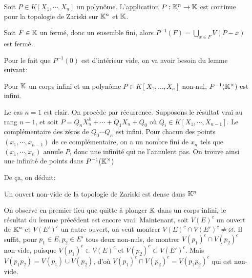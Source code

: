 \documentclass{article}
\begin{document}
\begin{proposition}
Soit $P \in K[X_1, \cdots, X_n]$ un polynôme. L'application $P: \mathbb{K}^n \to \mathbb{K}$ est continue pour la topologie de Zariski sur $\mathbb{K}^n$ et $\mathbb{K}$.
\end{proposition}

\begin{preuve}
Soit $F \in \mathbb{K}$ un fermé, donc un ensemble fini, alors $P^{-1}(F) = \bigcup_{x \in F}{V(P-x)}$ est fermé.
\end{preuve}

Pour le fait que $P^{-1}(0)$ est d'intérieur vide, on va avoir besoin du lemme suivant:
\begin{lemme}
Pour $\mathbb{K}$ un corps infini et un polynôme $P \in K[X_1, \ldots, X_n]$ non-nul, $P^{-1}(\mathbb{K}^\times)$ est infini.\\
\end{lemme}

\begin{preuve}
Le cas $n = 1$ est clair. On procède par récurrence. Supposons le résultat vrai au rang $n-1$, et soit $P = Q_nX_n^k + \cdots + Q_1X_n + Q_0$ où $Q_i \in K[X_1, \cdots, X_{n-1}]$. Le complémentaire des zéros de $Q_0\cdots Q_n$ est infini. Pour chacun des points $(x_1, \cdots, x_{n-1})$ de ce complémentaire, on a un nombre fini de $x_n$ tels que $(x_1, \cdots, x_n)$ annule $P$, donc une infinité qui ne l'annulent pas. On trouve ainsi une infinité de points dans $P^{-1}(\mathbb{K}^\times)$\\
\end{preuve}

De ça, on déduit:

\begin{proposition}
Un ouvert non-vide de la topologie de Zariski est dense dans $\mathbb{K}^n$
\end{proposition}

\begin{preuve}
On observe en premier lieu que quitte à plonger $\mathbb{K}$ dans un corps infini, le résultat du lemme précédent est encore vrai. Maintenant, soit $V(E)^c$ un ouvert de $\mathbb{K}^n$ et $V(E')^c$ un autre ouvert, on veut montrer $V(E)^c \cap V(E')^c \neq \varnothing$. Il suffit, pour $p_1 \in E, p_2 \in E'$ tous deux non-nuls, de montrer $V(p_1)^c \cap V(p_2)^c$ non-vide, puisque $V(p_1)^c \subset V(E)^c$ et $V(p_2)^c \subset V(E')^c$. Mais $V(p_1p_2) = V(p_1) \cup V(p_2)$, d'où $V(p_1)^c \cap V(p_2)^c = V(p_1p_2)^c$ qui est non-vide.\\
\end{preuve}
\end{document}
